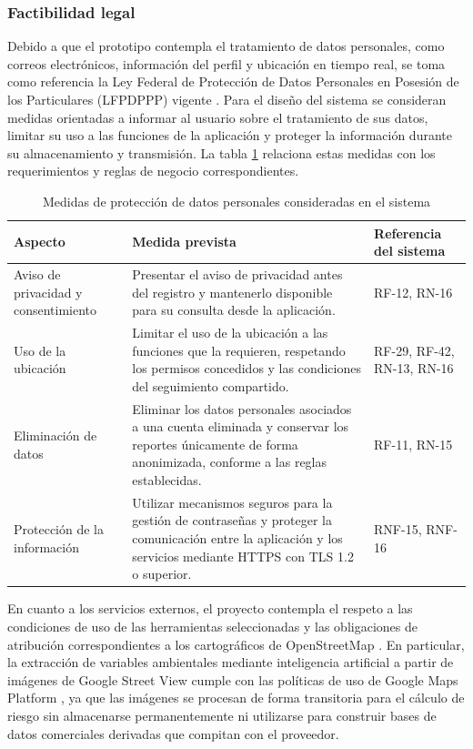 \subsubsection{Factibilidad legal}

Debido a que el prototipo contempla el tratamiento de datos personales,
como correos electrónicos, información del perfil y ubicación en tiempo
real, se toma como referencia la Ley Federal de Protección de Datos
Personales en Posesión de los Particulares (LFPDPPP) vigente
\cite{LFPDPPP_2025}. Para el diseño del sistema se consideran medidas
orientadas a informar al usuario sobre el tratamiento de sus datos,
limitar su uso a las funciones de la aplicación y proteger la información
durante su almacenamiento y transmisión. La tabla
\ref{tab:factibilidad_legal} relaciona estas medidas con los
requerimientos y reglas de negocio correspondientes.

\begin{table}[htbp]
\centering
\footnotesize
\caption{Medidas de protección de datos personales consideradas en el sistema}
\label{tab:factibilidad_legal}
\begin{tabularx}{\textwidth}{|p{3cm}|X|p{3cm}|}
\hline
\textbf{Aspecto} &
\textbf{Medida prevista} &
\textbf{Referencia del sistema} \\ \hline

Aviso de privacidad y consentimiento &
Presentar el aviso de privacidad antes del registro y mantenerlo
disponible para su consulta desde la aplicación. &
RF-12, RN-16 \\ \hline

Uso de la ubicación &
Limitar el uso de la ubicación a las funciones que la requieren,
respetando los permisos concedidos y las condiciones del seguimiento
compartido. &
RF-29, RF-42, RN-13, RN-16 \\ \hline

Eliminación de datos &
Eliminar los datos personales asociados a una cuenta eliminada y
conservar los reportes únicamente de forma anonimizada, conforme a
las reglas establecidas. &
RF-11, RN-15 \\ \hline

Protección de la información &
Utilizar mecanismos seguros para la gestión de contraseñas y
proteger la comunicación entre la aplicación y los servicios mediante
HTTPS con TLS 1.2 o superior. &
RNF-15, RNF-16 \\ \hline
\end{tabularx}
\end{table}

En cuanto a los servicios externos, el proyecto contempla el respeto a las condiciones de uso de las herramientas seleccionadas y las obligaciones de atribución correspondientes a los cartográficos de OpenStreetMap \cite{osm_attribution_guidelines}. En particular, la extracción de variables ambientales mediante inteligencia artificial a partir de imágenes de Google Street View cumple con las políticas de uso de Google Maps Platform \cite{google_maps_terms,google_streetview_policies}, ya que las imágenes se procesan de forma transitoria para el cálculo de riesgo sin almacenarse permanentemente ni utilizarse para construir bases de datos comerciales derivadas que compitan con el proveedor.